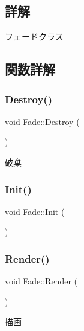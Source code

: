 \subsection{詳解}
フェードクラス 

\subsection{関数詳解}
\mbox{\label{class_fade_afd5cce157c2876a800ea59b2648547c2}} 
\subsubsection{\texorpdfstring{Destroy()}{Destroy()}}
{\footnotesize\ttfamily void Fade\+::\+Destroy (\begin{DoxyParamCaption}{ }\end{DoxyParamCaption})}



破棄 

\mbox{\label{class_fade_ac2a47819e1390abcae3259bcb42bddf5}} 
\subsubsection{\texorpdfstring{Init()}{Init()}}
{\footnotesize\ttfamily void Fade\+::\+Init (\begin{DoxyParamCaption}{ }\end{DoxyParamCaption})}

\mbox{\label{class_fade_abfe024be1a10d4849582adf58fe6682a}} 
\subsubsection{\texorpdfstring{Render()}{Render()}}
{\footnotesize\ttfamily void Fade\+::\+Render (\begin{DoxyParamCaption}{ }\end{DoxyParamCaption})}



描画 

\mbox{\label{class_fade_aaf97d1ac502c86612a97fde0e2fbf308}} 
